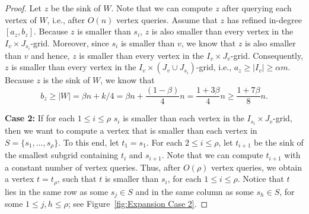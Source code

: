 \documentclass[a4paper,10pt]{article}
\newcommand{\indegree}{refined in-degree\xspace}
\begin{document}
\begin{proof}
Let $z$ be the sink of $W$. Note that we can compute $z$ after querying each vertex of $W$, i.e., after $O(n)$ vertex queries. Assume that $z$ has \indegree $[a_z, b_z]$. 
Because $z$ is smaller than $s_i$, $z$ is also smaller than every vertex in the $I_v\times J_{s_i}$-grid. Moreover, since $s_i$ is smaller than $v$, we know that $z$ is also smaller than $v$ and hence, $z$ is smaller than every vertex in the $I_v\times J_v$-grid.
Consequently, $z$ is smaller than every vertex in the $I_v\times (J_v\cup J_{s_i})$-grid, i.e., $a_z\geq |I_v| \geq \alpha m$.
Because $z$ is the sink of $W$, we know that
 $$b_z \geq |W| = \beta n + k/4 = \beta n + \frac{(1-\beta)}{4}n = \frac{1 + 3\beta}{4}n\geq \frac{1 + 7\beta}{8}n.$$


\textbf{Case 2:} If for each $1\leq i\leq \rho$ $s_i$ is smaller than each vertex in the $I_{s_i}\times J_v$-grid, then we want to compute a vertex that is smaller than each vertex in $S = \{s_1, \ldots, s_\rho\}$.
To this end, let $t_1 = s_1$.
For each $2\leq i\leq \rho$, let $t_{i+1}$ be the sink of the smallest subgrid containing $t_i$ and $s_{i+1}$. Note that we can compute $t_{i+1}$ with a constant number of vertex queries.
Thus, after $O(\rho)$ vertex queries, we obtain a vertex $t = t_\rho$, such that $t$ is smaller than $s_i$, for each $1\leq i\leq \rho$. Notice that $t$ lies in the same row as some $s_j\in S$ and in the same column as some $s_h\in S$, for some $1\leq j,h\leq \rho$; see Figure~\ref{fig:Expansion Case 2}. 


\end{proof}
\end{document}
